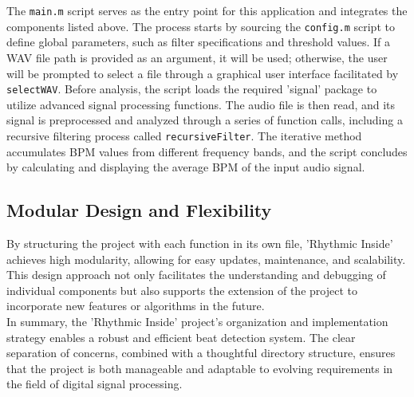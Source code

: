 The \texttt{main.m} script serves as the entry point for this application and integrates the components listed above. The process starts by sourcing the \texttt{config.m} script to define global parameters, such as filter specifications and threshold values. If a WAV file path is provided as an argument, it will be used; otherwise, the user will be prompted to select a file through a graphical user interface facilitated by \texttt{selectWAV}. Before analysis, the script loads the required 'signal' package to utilize advanced signal processing functions. The audio file is then read, and its signal is preprocessed and analyzed through a series of function calls, including a recursive filtering process called \texttt{recursiveFilter}. The iterative method accumulates BPM values from different frequency bands, and the script concludes by calculating and displaying the average BPM of the input audio signal.

\subsection{Modular Design and Flexibility}
By structuring the project with each function in its own file, 'Rhythmic Inside' achieves high modularity, allowing for easy updates, maintenance, and scalability. This design approach not only facilitates the understanding and debugging of individual components but also supports the extension of the project to incorporate new features or algorithms in the future. \\

In summary, the 'Rhythmic Inside' project's organization and implementation strategy enables a robust and efficient beat detection system. The clear separation of concerns, combined with a thoughtful directory structure, ensures that the project is both manageable and adaptable to evolving requirements in the field of digital signal processing.
